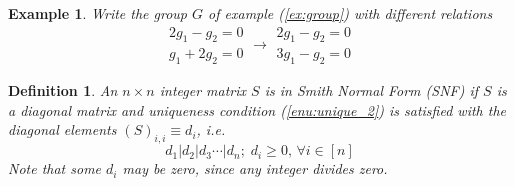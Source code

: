 \documentclass[11pt,english]{article}
\newtheorem{definition}[theorem]{Definition}
\newtheorem{example}[theorem]{Example}
\begin{document}
\begin{example}

Write the group $G$ of example (\ref{ex:group}) with different relations\[
\begin{array}{c}
2g_{1}-g_{2}=0\\
g_{1}+2g_{2}=0\end{array}\rightarrow\begin{array}{c}
2g_{1}-g_{2}=0\\
3g_{1}-g_{2}=0\end{array}\]


\end{example}

\begin{definition}

An $n\times n$ integer matrix $S$ is in \emph{Smith Normal Form}
(SNF) if $S$ is a diagonal matrix and uniqueness condition (\ref{enu:unique_2})
is satisfied with the diagonal elements $\left(S\right)_{i,i}\equiv d_{i}$,
i.e. \[
d_{1}|d_{2}|d_{3}\cdots|d_{n};\; d_{i}\ge0,\,\forall i\in\left[n\right]\]
Note that some $d_{i}$ may be zero, since any integer divides zero. 

\end{definition}
\end{document}

